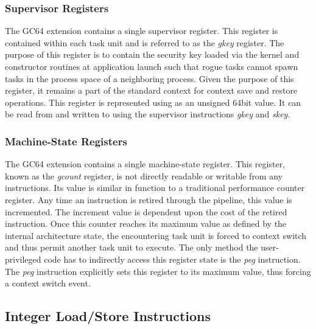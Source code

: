 \documentclass{article}
\begin{document}
\begin{center}
\end{center}

\subsubsection{Supervisor Registers}

The GC64 extension contains a single supervisor register.  This register is contained within each task unit and is referred to as the \emph{gkey} register.  The purpose of this register is to contain the security key loaded via the kernel and constructor routines at application launch such that rogue tasks cannot spawn tasks in the process space of a neighboring process.  Given the purpose of this register, it remains a part of the standard context for context save and restore operations.  This register is represented using as an unsigned 64bit value.  It can be read from and written to using the supervisor instructions \emph{gkey} and \emph{skey}.  

\begin{center}
\end{center}

\subsubsection{Machine-State Registers}

The GC64 extension contains a single machine-state register.  This register, known as the \emph{gcount} register, is not directly readable or writable from any instructions.  Its value is similar in function to a traditional performance counter register.  Any time an instruction is retired through the pipeline, this value is incremented.  The increment value is dependent upon the cost of the retired instruction.  Once this counter reaches its maximum value as defined by the internal architecture state, the encountering task unit is forced to context switch and thus permit another task unit to execute.  The only method the user-privileged code has to indirectly access this register state is the \emph{peg} instruction.  The \emph{peg} instruction explicitly sets this register to its maximum value, thus forcing a context switch event.    

\subsection{Integer Load/Store Instructions}
\end{document}
